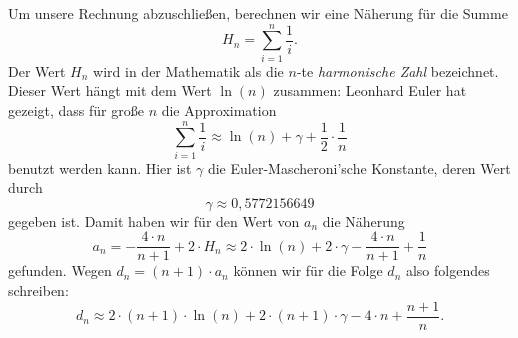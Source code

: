 Um unsere Rechnung abzuschlie{\ss}en, berechnen wir eine N\"aherung f\"ur die Summe 
\[ H_n = \sum\limits_{i=1}^{n}\frac{1}{i}.\]
Der Wert $H_n$ wird in der Mathematik als die $n$-te \emph{harmonische Zahl} bezeichnet.
Dieser Wert h\"angt mit dem Wert $\ln(n)$ zusammen: Leonhard Euler hat gezeigt, dass f\"ur
gro{\ss}e $n$ die Approximation
\[ \sum\limits_{i=1}^n \frac{1}{i} \approx \ln(n) + \gamma + \frac{1}{2} \cdot \frac{1}{n} \]
benutzt werden kann.  Hier ist $\gamma$ die Euler-Mascheroni'sche Konstante, deren Wert durch
\[ \gamma \approx 0,5772156649 \]
gegeben ist.  Damit haben wir f\"ur den Wert von $a_n$ die N\"aherung
\[ a_n = - \frac{4 \cdot n}{n+1} + 2 \cdot H_n \approx  
         2 \cdot \ln(n) + 2 \cdot \gamma - \frac{4 \cdot n}{n+1} + \frac{1}{n} 
\]
gefunden. Wegen $d_n = (n+1) \cdot a_n$ k\"onnen wir f\"ur die Folge $d_n$ also folgendes schreiben:
\[ d_n \approx  
       2 \cdot (n + 1) \cdot \ln(n) + 2 \cdot (n+1) \cdot \gamma - 4 \cdot n + \frac{n+1}{n}.
\]
\vspace*{0.3cm}


